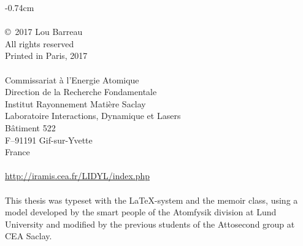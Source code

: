 \thispagestyle{empty}

\clearpage

\thispagestyle{empty}
\begin{narrow}{-0.7\marginwidth}{4cm}
    \vspace*{\fill}
    \footnotesize
    \noindent \textsc{\thesistitle}\\
    \vspace*{0.1cm}\\
    \noindent \copyright~2017 Lou Barreau\\
    \noindent All rights reserved\\
    \noindent Printed in Paris, 2017\\
    \vspace*{0.1cm}\\
    \noindent Commissariat à l'Energie Atomique\\
    \noindent Direction de la Recherche Fondamentale\\
    \noindent Institut Rayonnement Mati\`ere Saclay\\
    \noindent Laboratoire Interactions, Dynamique et Lasers\\
    \noindent B\^atiment 522\\
    \noindent F--91191 Gif-sur-Yvette\\
    \noindent France\\
    \vspace*{-0.2cm}\\
    \noindent \url{http://iramis.cea.fr/LIDYL/index.php}\\
    \vspace*{0.1cm}\\
    \noindent This thesis was typeset with the \LaTeX -system and the memoir class, using a model developed by the smart people of the Atomfysik division at Lund University and modified by the previous students of the Attosecond group at CEA Saclay.
\end{narrow}


